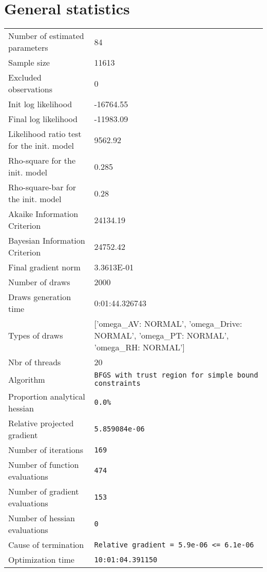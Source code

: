 



\section{General statistics}
\begin{tabular}{ll}
Number of estimated parameters & 84 \\
Sample size & 11613 \\
Excluded observations & 0 \\
Init log likelihood & -16764.55 \\
Final log likelihood & -11983.09 \\
Likelihood ratio test for the init. model & 9562.92 \\
Rho-square for the init. model & 0.285 \\
Rho-square-bar for the init. model & 0.28 \\
Akaike Information Criterion & 24134.19 \\
Bayesian Information Criterion & 24752.42 \\
Final gradient norm & 3.3613E-01 \\
Number of draws & 2000 \\
Draws generation time & 0:01:44.326743 \\
Types of draws & ['omega_AV: NORMAL', 'omega_Drive: NORMAL', 'omega_PT: NORMAL', 'omega_RH: NORMAL'] \\
Nbr of threads & 20 \\
Algorithm & \verb$BFGS with trust region for simple bound constraints$ \\
Proportion analytical hessian & \verb$0.0%$ \\
Relative projected gradient & \verb$5.859084e-06$ \\
Number of iterations & \verb$169$ \\
Number of function evaluations & \verb$474$ \\
Number of gradient evaluations & \verb$153$ \\
Number of hessian evaluations & \verb$0$ \\
Cause of termination & \verb$Relative gradient = 5.9e-06 <= 6.1e-06$ \\
Optimization time & \verb$10:01:04.391150$ \\
\end{tabular}

